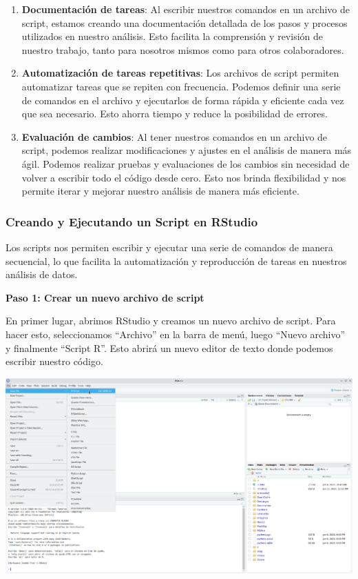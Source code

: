 \documentclass[
  letterpaper,
  DIV=11,
  numbers=noendperiod]{scrartcl}
\begin{document}
\begin{enumerate}
\def\labelenumi{\arabic{enumi}.}
\item
  \textbf{Documentación de tareas}: Al escribir nuestros comandos en un
  archivo de script, estamos creando una documentación detallada de los
  pasos y procesos utilizados en nuestro análisis. Esto facilita la
  comprensión y revisión de nuestro trabajo, tanto para nosotros mismos
  como para otros colaboradores.
\item
  \textbf{Automatización de tareas repetitivas}: Los archivos de script
  permiten automatizar tareas que se repiten con frecuencia. Podemos
  definir una serie de comandos en el archivo y ejecutarlos de forma
  rápida y eficiente cada vez que sea necesario. Esto ahorra tiempo y
  reduce la posibilidad de errores.
\item
  \textbf{Evaluación de cambios}: Al tener nuestros comandos en un
  archivo de script, podemos realizar modificaciones y ajustes en el
  análisis de manera más ágil. Podemos realizar pruebas y evaluaciones
  de los cambios sin necesidad de volver a escribir todo el código desde
  cero. Esto nos brinda flexibilidad y nos permite iterar y mejorar
  nuestro análisis de manera más eficiente.
\end{enumerate}

\hypertarget{creando-y-ejecutando-un-script-en-rstudio}{%
\subsubsection{Creando y Ejecutando un Script en
RStudio}\label{creando-y-ejecutando-un-script-en-rstudio}}

Los scripts nos permiten escribir y ejecutar una serie de comandos de
manera secuencial, lo que facilita la automatización y reproducción de
tareas en nuestros análisis de datos.

\textbf{Paso 1: Crear un nuevo archivo de script}

En primer lugar, abrimos RStudio y creamos un nuevo archivo de script.
Para hacer esto, seleccionamos ``Archivo'' en la barra de menú, luego
``Nuevo archivo'' y finalmente ``Script R''. Esto abrirá un nuevo editor
de texto donde podemos escribir nuestro código.

\includegraphics{images/Screenshot_20230611_001234.png}
\end{document}
